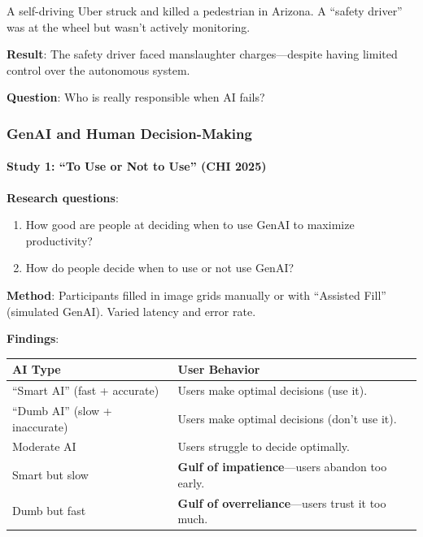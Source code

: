 \begin{exbox}
A self-driving Uber struck and killed a pedestrian in Arizona. A ``safety driver'' was at the wheel but wasn't actively monitoring.

\textbf{Result}: The safety driver faced manslaughter charges---despite having limited control over the autonomous system.

\textbf{Question}: Who is really responsible when AI fails?
\end{exbox}

\subsubsection*{GenAI and Human Decision-Making}

\paragraph*{Study 1: ``To Use or Not to Use'' (CHI 2025)}
\textbf{Research questions}:
\begin{enumerate}
  \item How good are people at deciding when to use GenAI to maximize productivity?
  \item How do people decide when to use or not use GenAI?
\end{enumerate}

\textbf{Method}: Participants filled in image grids manually or with ``Assisted Fill'' (simulated GenAI). Varied latency and error rate.

\textbf{Findings}:
\begin{center}
\renewcommand{\arraystretch}{1.3}
\begin{tabular}{@{} l p{8cm} @{}}
\toprule
\textbf{AI Type} & \textbf{User Behavior} \\
\midrule
``Smart AI'' (fast + accurate) & Users make optimal decisions (use it). \\
``Dumb AI'' (slow + inaccurate) & Users make optimal decisions (don't use it). \\
Moderate AI & Users struggle to decide optimally. \\
Smart but slow & \textbf{Gulf of impatience}---users abandon too early. \\
Dumb but fast & \textbf{Gulf of overreliance}---users trust it too much. \\
\bottomrule
\end{tabular}
\end{center}


